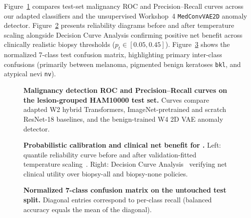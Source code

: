 \begin{table}[htbp]
\centering
\caption{\textbf{Clinical threshold analysis on the untouched HAM10000 test split for \WSixBestModel{}.} All thresholds are fixed strictly on validation; 95\% CIs are computed via stratified bootstrapping.}
\label{tab:thresholds}
\small

\end{table}

Figure~\ref{fig:roc_pr} compares test-set malignancy ROC and Precision--Recall curves across our adapted classifiers and the unsupervised Workshop~4 \texttt{MedConvVAE2D} anomaly detector. Figure~\ref{fig:cal_dca} presents reliability diagrams before and after temperature scaling alongside Decision Curve Analysis confirming positive net benefit across clinically realistic biopsy thresholds ($p_t \in [0.05, 0.45]$). Figure~\ref{fig:cm_best} shows the normalized 7-class test confusion matrix, highlighting primary inter-class confusions (primarily between melanoma, pigmented benign keratoses \texttt{bkl}, and atypical nevi \texttt{nv}).

\begin{figure}[htbp]
\centering
{}
\caption{\textbf{Malignancy detection ROC and Precision--Recall curves on the lesion-grouped HAM10000 test set.} Curves compare adapted W2 hybrid Transformers, ImageNet-pretrained and scratch ResNet-18 baselines, and the benign-trained W4 2D VAE anomaly detector.}
\label{fig:roc_pr}
\end{figure}

\begin{figure}[htbp]
\centering
{}
\caption{\textbf{Probabilistic calibration and clinical net benefit for \WSixBestModel{}.} Left: quantile reliability curve before and after validation-fitted temperature scaling~\cite{Guo2017calibration}. Right: Decision Curve Analysis~\cite{Vickers2006decision} verifying net clinical utility over biopsy-all and biopsy-none policies.}
\label{fig:cal_dca}
\end{figure}

\begin{figure}[htbp]
\centering
{}
\caption{\textbf{Normalized 7-class confusion matrix on the untouched test split.} Diagonal entries correspond to per-class recall (balanced accuracy equals the mean of the diagonal).}
\label{fig:cm_best}
\end{figure}

